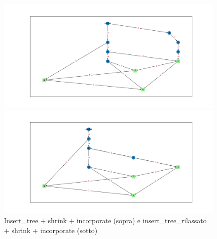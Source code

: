 \documentclass{article}
\begin{document}
\begin{figure}[H]
    \centering
    \includegraphics[max width=\linewidth, max height=0.9\textheight, keepaspectratio]{Resources/Uguaglianza+shrink+incorporate.png}
    
    \includegraphics[max width=\linewidth, max height=0.9\textheight, keepaspectratio]{Resources/insert_tree_rilassato+shrink+incorporate.png}
    \caption{Insert\_tree + shrink + incorporate (sopra) e insert\_tree\_rilassato + shrink + incorporate (sotto)}
    \label{fig:esempio4}
\end{figure}
\end{document}
